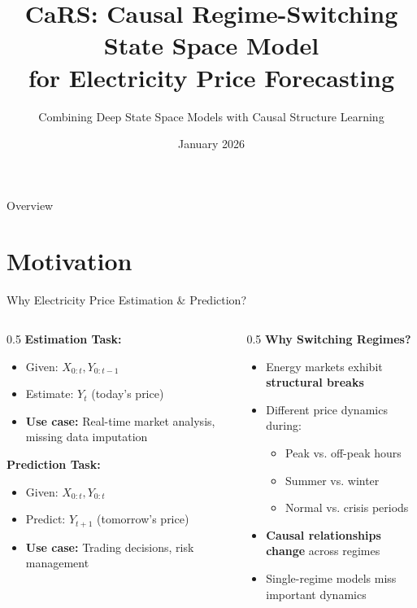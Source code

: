 \documentclass[aspectratio=169]{beamer}
\title{CaRS: Causal Regime-Switching State Space Model\\for Electricity Price Forecasting}
\subtitle{Combining Deep State Space Models with Causal Structure Learning}
\date{January 2026}
\begin{document}
\begin{frame}
\titlepage
\end{frame}

\begin{frame}{Overview}
\tableofcontents
\end{frame}

\section{Motivation}

\begin{frame}{Why Electricity Price Estimation \& Prediction?}
\begin{columns}
\begin{column}{0.5\textwidth}
\textbf{Estimation Task:}
\begin{itemize}
    \item Given: $X_{0:t}, Y_{0:t-1}$
    \item Estimate: $Y_t$ (today's price)
    \item \textbf{Use case:} Real-time market analysis, missing data imputation
\end{itemize}

\vspace{0.3cm}
\textbf{Prediction Task:}
\begin{itemize}
    \item Given: $X_{0:t}, Y_{0:t}$
    \item Predict: $Y_{t+1}$ (tomorrow's price)
    \item \textbf{Use case:} Trading decisions, risk management
\end{itemize}
\end{column}

\begin{column}{0.5\textwidth}
\textbf{Why Switching Regimes?}
\begin{itemize}
    \item Energy markets exhibit \textbf{structural breaks}
    \item Different price dynamics during:
    \begin{itemize}
        \item Peak vs. off-peak hours
        \item Summer vs. winter
        \item Normal vs. crisis periods
    \end{itemize}
    \item \textbf{Causal relationships change} across regimes
    \item Single-regime models miss important dynamics
\end{itemize}
\end{column}
\end{columns}


\end{frame}
\end{document}
